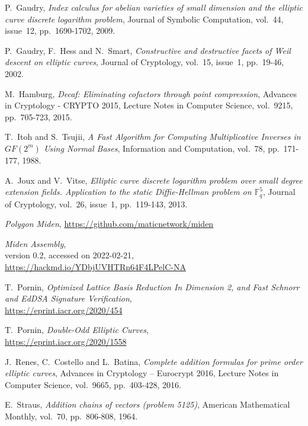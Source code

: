 \documentclass{llncs}
\newcommand{\GF}{GF}
\begin{document}
\begin{thebibliography}{20}
P.~Gaudry,
\emph{Index calculus for abelian varieties of small dimension and the
elliptic curve discrete logarithm problem},
Journal of Symbolic Computation, vol.~44, issue~12, pp.~1690-1702, 2009.

P.~Gaudry, F.~Hess and N.~Smart,
\emph{Constructive and destructive facets of Weil descent on elliptic curves},
Journal of Cryptology, vol.~15, issue~1, pp.~19-46, 2002.

M.~Hamburg,
\emph{Decaf: Eliminating cofactors through point compression},
Advances in Cryptology - CRYPTO 2015, Lecture Notes in Computer Science,
vol.~9215, pp.~705-723, 2015.

T.~Itoh and S.~Tsujii,
\emph{A Fast Algorithm for Computing Multiplicative Inverses in
$\GF(2^m)$ Using Normal Bases},
Information and Computation, vol.~78, pp.~171-177, 1988.

A.~Joux and V.~Vitse,
\emph{Elliptic curve discrete logarithm problem over small degree
extension fields. Application to the static Diffie-Hellman problem on
$\mathbb{F}_q^5$},
Journal of Cryptology, vol.~26, issue~1, pp.~119-143, 2013.

\emph{Polygon Miden},
\url{https://github.com/maticnetwork/miden}

\emph{Miden Assembly},\\
version 0.2, accessed on 2022-02-21,\\
\url{https://hackmd.io/YDbjUVHTRn64F4LPelC-NA}

T.~Pornin,
\emph{Optimized Lattice Basis Reduction In Dimension 2, and Fast Schnorr
and EdDSA Signature Verification},\\
\url{https://eprint.iacr.org/2020/454}

T.~Pornin,
\emph{Double-Odd Elliptic Curves},\\
\url{https://eprint.iacr.org/2020/1558}

J.~Renes, C.~Costello and L.~Batina,
\emph{Complete addition formulas for prime order elliptic curves},
Advances in Cryptology – Eurocrypt 2016, Lecture Notes in Computer Science,
vol.~9665, pp.~403-428, 2016.

E.~Straus,
\emph{Addition chains of vectors (problem 5125)},
American Mathematical Monthly, vol.~70, pp.~806-808, 1964.

\end{thebibliography}

\end{document}
